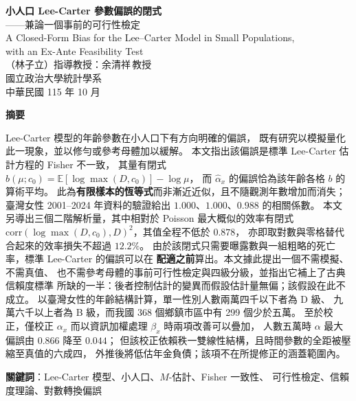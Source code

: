 \documentclass[UTF8, fontset=macnew, a4paper, 12pt]{ctexart}
\newcommand{\Ex}{\mathbb{E}}
\begin{document}

\begin{center}
{\bfseries 小人口 Lee-Carter 參數偏誤的閉式}\\[4pt]
{ ——兼論一個事前的可行性檢定}\\[6pt]
{ A Closed-Form Bias for the Lee--Carter Model in Small Populations,}\\[2pt]
{ with an Ex-Ante Feasibility Test}\\[12pt]
{ （林子立）\quad 指導教授：余清祥\,教授}\\[4pt]
{ 國立政治大學統計學系}\\[4pt]
{ 中華民國 115 年 10 月}
\end{center}

\vspace{6pt}
\begin{center}
\begin{minipage}{0.92\textwidth}
\small
\textbf{摘要}\par\vspace{4pt}
Lee-Carter 模型的年齡參數在小人口下有方向明確的偏誤，
既有研究以模擬量化此一現象，並以修勻或參考母體加以緩解。
本文指出該偏誤是標準 Lee-Carter 估計方程的 Fisher 不一致，
其量有閉式 $b(\mu;c_0)=\Ex[\log\max(D,c_0)]-\log\mu$，
而 $\hat\alpha_x$ 的偏誤恰為該年齡各格 $b$ 的算術平均。
此為\textbf{有限樣本的恆等式}而非漸近近似，且不隨觀測年數增加而消失；
臺灣女性 2001--2024 年資料的驗證給出 $1.000$、$1.000$、$0.988$ 的相關係數。
本文另導出三個二階解析量，其中相對於 Poisson 最大概似的效率有閉式
$\mathrm{corr}(\log\max(D,c_0),D)^2$，其值全程不低於 $0.878$，
亦即取對數與零格替代合起來的效率損失不超過 $12.2\%$。
由於該閉式只需要曝露數與一組粗略的死亡率，標準 Lee-Carter 的偏誤可以在
\textbf{配適之前}算出。本文據此提出一個不需模擬、不需真值、
也不需參考母體的事前可行性檢定與四級分級，並指出它補上了古典信賴度標準
所缺的一半：後者控制估計的變異而假設估計量無偏；該假設在此不成立。
以臺灣女性的年齡結構計算，單一性別人數兩萬四千以下者為 D 級、
九萬六千以上者為 B 級，而我國 368 個鄉鎮市區中有 299 個少於五萬。
至於校正，僅校正 $\alpha_x$ 而以資訊加權處理 $\beta_x$ 時兩項改善可以疊加，
人數五萬時 $\alpha$ 最大偏誤由 $0.866$ 降至 $0.044$；
但該校正依賴秩一雙線性結構，且時間參數的全距被壓縮至真值的六成四，
外推後將低估年金負債；該項不在所提修正的涵蓋範圍內。
\par\vspace{6pt}
\textbf{關鍵詞}：Lee-Carter 模型、小人口、$M$-估計、Fisher 一致性、
可行性檢定、信賴度理論、對數轉換偏誤
\end{minipage}
\end{center}
\end{document}
